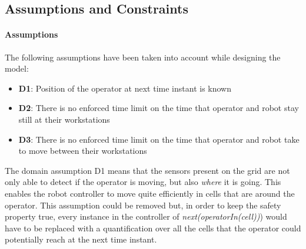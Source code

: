 \subsection{Assumptions and Constraints}

\paragraph{Assumptions}
\newcommand{\DI}{\textbf{D1}: Position of the operator at next time instant is known}
\newcommand{\DII}{\textbf{D2}: There is no enforced time limit on the time that operator and robot stay still at their workstations}
\newcommand{\DIII}{\textbf{D3}: There is no enforced time limit on the time that operator and robot take to move between their workstations}
\newcommand{\DIV}{\textbf{D4}: }
\newcommand{\DV}{\textbf{D5}: }
\newcommand{\DVI}{\textbf{D6}: }
\newcommand{\DVII}{\textbf{D7}: }
\newcommand{\DVIII}{\textbf{D8}: }
\newcommand{\DIX}{\textbf{D9}: }
\newcommand{\DX}{\textbf{D10}: }
\newcommand{\DXI}{\textbf{D11}: }

The following assumptions have been taken into account while designing the model:
\newline\begin{itemize}
	\item  \DI
	\item  \DII
	\item  \DIII
\end{itemize}

The domain assumption D1 means that the sensors present on the grid are not only able to detect if the operator is moving, but also \textit{where} it is going. This enables the robot controller to move quite efficiently in cells that are around the operator. This assumption could be removed but, in order to keep the safety property true, every instance in the controller of \textit{next(operatorIn(cell))}) would have to be replaced with a quantification over all the cells that the operator could potentially reach at the next time instant.
\newpage


